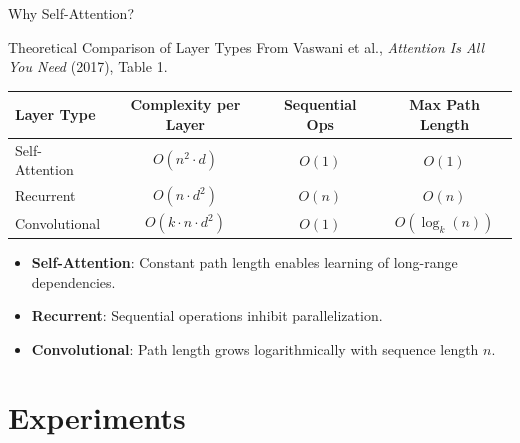 \documentclass[
	11pt,
	aspectratio=169,
]{beamer}
\begin{document}
\begin{frame}{Why Self-Attention?}
    \centering
\begin{block}{Theoretical Comparison of Layer Types}
    From Vaswani et al., \textit{Attention Is All You Need} (2017), Table 1.
\end{block}

\vspace{0.5em}
\begin{table}
\centering
\begin{tabular}{l c c c}
\toprule
\textbf{Layer Type} & \textbf{Complexity per Layer} & \textbf{Sequential Ops} & \textbf{Max Path Length} \\
\midrule
Self-Attention & $O(n^2 \cdot d)$ & $O(1)$ & $O(1)$ \\
Recurrent & $O(n \cdot d^2)$ & $O(n)$ & $O(n)$ \\
Convolutional & $O(k \cdot n \cdot d^2)$ & $O(1)$ & $O(\log_k(n))$ \\
\bottomrule
\end{tabular}
\end{table}

\begin{itemize}
    \item \textbf{Self-Attention}: Constant path length enables learning of long-range dependencies.
    \item \textbf{Recurrent}: Sequential operations inhibit parallelization.
    \item \textbf{Convolutional}: Path length grows logarithmically with sequence length $n$.
\end{itemize}
\end{frame}



\section{Experiments}
\end{document}
